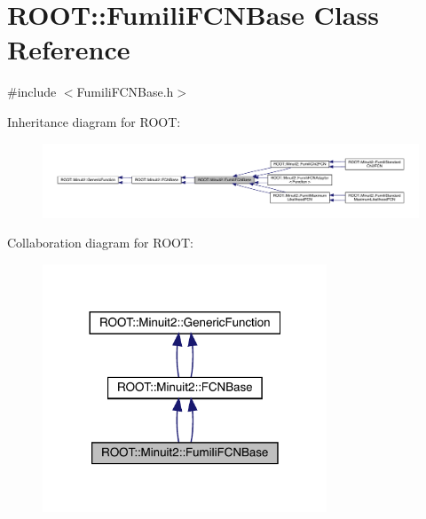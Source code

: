 \hypertarget{classROOT_1_1Minuit2_1_1FumiliFCNBase}{}\section{R\+O\+OT\+:\+:Fumili\+F\+C\+N\+Base Class Reference}
\label{classROOT_1_1Minuit2_1_1FumiliFCNBase}


{\ttfamily \#include $<$Fumili\+F\+C\+N\+Base.\+h$>$}



Inheritance diagram for R\+O\+OT\+:\nopagebreak
\begin{figure}[H]
\begin{center}
\leavevmode
\includegraphics[width=350pt]{de/d01/classROOT_1_1Minuit2_1_1FumiliFCNBase__inherit__graph}
\end{center}
\end{figure}


Collaboration diagram for R\+O\+OT\+:\nopagebreak
\begin{figure}[H]
\begin{center}
\leavevmode
\includegraphics[width=240pt]{d3/d99/classROOT_1_1Minuit2_1_1FumiliFCNBase__coll__graph}
\end{center}
\end{figure}
